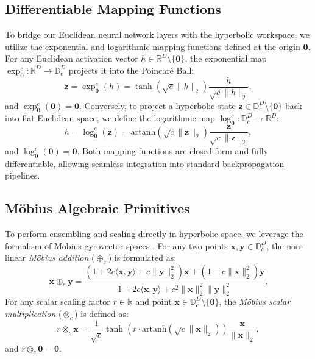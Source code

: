\subsection{Differentiable Mapping Functions}
To bridge our Euclidean neural network layers with the hyperbolic workspace, we utilize the exponential and logarithmic mapping functions defined at the origin $\mathbf{0}$. For any Euclidean activation vector $h \in \mathbb{R}^D \setminus \{\mathbf{0}\}$, the exponential map $\exp_{\mathbf{0}}^c: \mathbb{R}^D \to \mathbb{D}_c^D$ projects it into the Poincaré Ball:
\begin{equation}
\mathbf{z} = \exp_{\mathbf{0}}^c(h) = \tanh(\sqrt{c} \|h\|_2) \frac{h}{\sqrt{c} \|h\|_2},
\end{equation}
and $\exp_{\mathbf{0}}^c(\mathbf{0}) = \mathbf{0}$. 
Conversely, to project a hyperbolic state $\mathbf{z} \in \mathbb{D}_c^D \setminus \{\mathbf{0}\}$ back into flat Euclidean space, we define the logarithmic map $\log_{\mathbf{0}}^c: \mathbb{D}_c^D \to \mathbb{R}^D$:
\begin{equation}
h = \log_{\mathbf{0}}^c(\mathbf{z}) = \text{artanh}(\sqrt{c} \|\mathbf{z}\|_2) \frac{\mathbf{z}}{\sqrt{c} \|\mathbf{z}\|_2},
\end{equation}
and $\log_{\mathbf{0}}^c(\mathbf{0}) = \mathbf{0}$. Both mapping functions are closed-form and fully differentiable, allowing seamless integration into standard backpropagation pipelines.

\subsection{Möbius Algebraic Primitives}
To perform ensembling and scaling directly in hyperbolic space, we leverage the formalism of Möbius gyrovector spaces \cite{ganea2018hyperbolic}. 
For any two points $\mathbf{x}, \mathbf{y} \in \mathbb{D}_c^D$, the non-linear \emph{Möbius addition} ($\oplus_c$) is formulated as:
\begin{equation}
\mathbf{x} \oplus_c \mathbf{y} = \frac{(1 + 2c\langle\mathbf{x}, \mathbf{y}\rangle + c\|\mathbf{y}\|_2^2)\mathbf{x} + (1 - c\|\mathbf{x}\|_2^2)\mathbf{y}}{1 + 2c\langle\mathbf{x}, \mathbf{y}\rangle + c^2\|\mathbf{x}\|_2^2\|\mathbf{y}\|_2^2}.
\end{equation}
For any scalar scaling factor $r \in \mathbb{R}$ and point $\mathbf{x} \in \mathbb{D}_c^D \setminus \{\mathbf{0}\}$, the \emph{Möbius scalar multiplication} ($\otimes_c$) is defined as:
\begin{equation}
r \otimes_c \mathbf{x} = \frac{1}{\sqrt{c}} \tanh\left( r \cdot \text{artanh}(\sqrt{c} \|\mathbf{x}\|_2) \right) \frac{\mathbf{x}}{\|\mathbf{x}\|_2},
\end{equation}
and $r \otimes_c \mathbf{0} = \mathbf{0}$.

